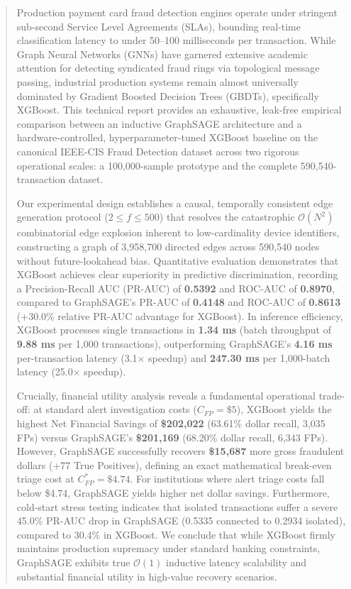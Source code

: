 \documentclass[11pt,a4paper]{report}
\begin{document}
\begin{abstract}
Production payment card fraud detection engines operate under stringent sub-second Service Level Agreements (SLAs), bounding real-time classification latency to under 50--100 milliseconds per transaction. While Graph Neural Networks (GNNs) have garnered extensive academic attention for detecting syndicated fraud rings via topological message passing, industrial production systems remain almost universally dominated by Gradient Boosted Decision Trees (GBDTs), specifically XGBoost. This technical report provides an exhaustive, leak-free empirical comparison between an inductive GraphSAGE architecture and a hardware-controlled, hyperparameter-tuned XGBoost baseline on the canonical IEEE-CIS Fraud Detection dataset across two rigorous operational scales: a 100,000-sample prototype and the complete 590,540-transaction dataset.

Our experimental design establishes a causal, temporally consistent edge generation protocol ($2 \leq f \leq 500$) that resolves the catastrophic $\mathcal{O}(N^2)$ combinatorial edge explosion inherent to low-cardinality device identifiers, constructing a graph of 3,958,700 directed edges across 590,540 nodes without future-lookahead bias. Quantitative evaluation demonstrates that XGBoost achieves clear superiority in predictive discrimination, recording a Precision-Recall AUC (PR-AUC) of \textbf{0.5392} and ROC-AUC of \textbf{0.8970}, compared to GraphSAGE's PR-AUC of \textbf{0.4148} and ROC-AUC of \textbf{0.8613} (+30.0\% relative PR-AUC advantage for XGBoost). In inference efficiency, XGBoost processes single transactions in \textbf{1.34 ms} (batch throughput of \textbf{9.88 ms} per 1,000 transactions), outperforming GraphSAGE's \textbf{4.16 ms} per-transaction latency (3.1$\times$ speedup) and \textbf{247.30 ms} per 1,000-batch latency (25.0$\times$ speedup).

Crucially, financial utility analysis reveals a fundamental operational trade-off: at standard alert investigation costs ($C_{FP} = \$5$), XGBoost yields the highest Net Financial Savings of \textbf{\$202,022} (63.61\% dollar recall, 3,035 FPs) versus GraphSAGE's \textbf{\$201,169} (68.20\% dollar recall, 6,343 FPs). However, GraphSAGE successfully recovers \textbf{\$15,687} more gross fraudulent dollars (+77 True Positives), defining an exact mathematical break-even triage cost at $C_{FP}^* = \$4.74$. For institutions where alert triage costs fall below \$4.74, GraphSAGE yields higher net dollar savings. Furthermore, cold-start stress testing indicates that isolated transactions suffer a severe 45.0\% PR-AUC drop in GraphSAGE (0.5335 connected to 0.2934 isolated), compared to 30.4\% in XGBoost. We conclude that while XGBoost firmly maintains production supremacy under standard banking constraints, GraphSAGE exhibits true $\mathcal{O}(1)$ inductive latency scalability and substantial financial utility in high-value recovery scenarios.
\end{abstract}
\end{document}
